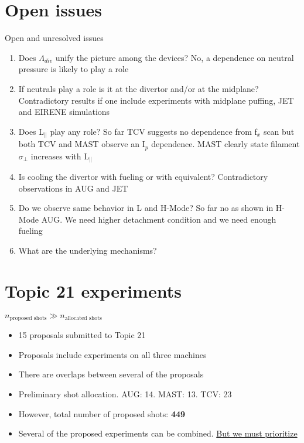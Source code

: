 \documentclass[10pt, compress]{beamer}
\begin{document}
  \section{Open issues}
  \begin{frame}{Open and unresolved issues}
  \begin{enumerate}[<+(1) | invisible@-+>]
    \item Does $\Lambda_{div}$ unify the picture among the devices?
      \alert{No, a dependence on neutral pressure is likely to play a role}
    \item If neutrals play a role is it at the divertor and/or at the midplane?
      \alert{Contradictory results if one include experiments with
        midplane puffing, JET and EIRENE simulations}
    \item Does L$_\parallel$ play any role? \alert{So far TCV suggests no
      dependence from f$_x$ scan but both TCV and MAST observe an
      I$_p$ dependence. MAST clearly state filament $\sigma_{\perp}$
      increases with L$_{\parallel}$ }
    \item Is cooling the divertor with fueling or with equivalent? \alert{Contradictory observations in AUG and JET}
    \item Do we observe same behavior in L and H-Mode? \alert{So
      far no as shown in H-Mode AUG. We need higher detachment
      condition and we need enough fueling}
      \item What are the underlying mechanisms? 
    \end{enumerate}
  \end{frame}
  
\section{Topic 21 experiments }
\begin{frame}{$n_{\text{proposed shots}} \gg n_{\text{allocated shots}}$}
	\begin{itemize}
		\item 15 proposals submitted to Topic 21
		\item Proposals include experiments on all three machines 
		\item There are overlaps between several of the proposals 
		\item Preliminary shot allocation. AUG: 14. MAST: 13. TCV: 23
		\item However, total number of proposed shots:  \textbf{449}
		\item Several of the proposed experiments can be combined. \underline{But we must prioritize}
	\end{itemize}
\end{frame}
\end{document}
